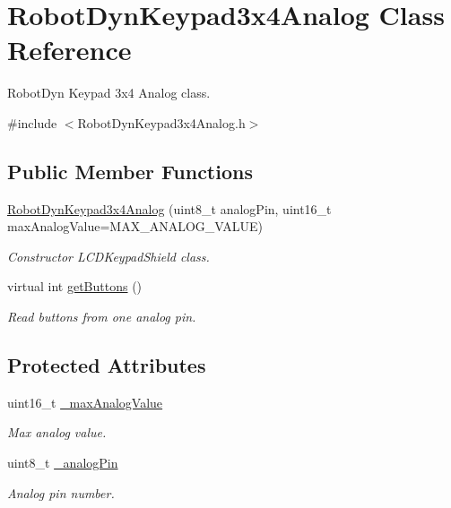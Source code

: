\hypertarget{class_robot_dyn_keypad3x4_analog}{}\section{Robot\+Dyn\+Keypad3x4\+Analog Class Reference}
\label{class_robot_dyn_keypad3x4_analog}


Robot\+Dyn Keypad 3x4 Analog class.  




{\ttfamily \#include $<$Robot\+Dyn\+Keypad3x4\+Analog.\+h$>$}

\subsection*{Public Member Functions}
\begin{DoxyCompactItemize}
\item 
\hyperlink{class_robot_dyn_keypad3x4_analog_afbbe61d9d440d6f99befeb6cd819e90e}{Robot\+Dyn\+Keypad3x4\+Analog} (uint8\+\_\+t analog\+Pin, uint16\+\_\+t max\+Analog\+Value=M\+A\+X\+\_\+\+A\+N\+A\+L\+O\+G\+\_\+\+V\+A\+L\+UE)
\begin{DoxyCompactList}\small\item\em Constructor L\+C\+D\+Keypad\+Shield class. \end{DoxyCompactList}\item 
virtual int \hyperlink{class_robot_dyn_keypad3x4_analog_a2124fcf7e5e0298b537d2493549a9082}{get\+Buttons} ()
\begin{DoxyCompactList}\small\item\em Read buttons from one analog pin. \end{DoxyCompactList}\end{DoxyCompactItemize}
\subsection*{Protected Attributes}
\begin{DoxyCompactItemize}
\item 
uint16\+\_\+t \hyperlink{class_robot_dyn_keypad3x4_analog_a27cbce4f1859303d0909335e72d43b91}{\+\_\+max\+Analog\+Value}\hypertarget{class_robot_dyn_keypad3x4_analog_a27cbce4f1859303d0909335e72d43b91}{}\label{class_robot_dyn_keypad3x4_analog_a27cbce4f1859303d0909335e72d43b91}

\begin{DoxyCompactList}\small\item\em Max analog value. \end{DoxyCompactList}\item 
uint8\+\_\+t \hyperlink{class_robot_dyn_keypad3x4_analog_a7ab95a55b9b0faaab6c2fab240d8080f}{\+\_\+analog\+Pin}\hypertarget{class_robot_dyn_keypad3x4_analog_a7ab95a55b9b0faaab6c2fab240d8080f}{}\label{class_robot_dyn_keypad3x4_analog_a7ab95a55b9b0faaab6c2fab240d8080f}

\begin{DoxyCompactList}\small\item\em Analog pin number. \end{DoxyCompactList}\end{DoxyCompactItemize}


